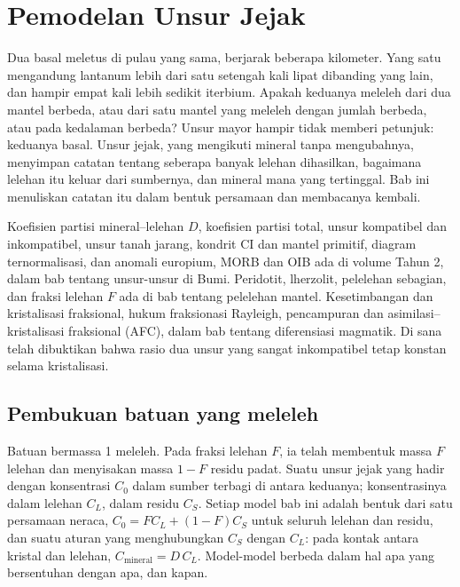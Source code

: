 \chapter{Pemodelan Unsur Jejak}\label{ch:b3:trace-element-modelling}

Dua basal meletus di pulau yang sama, berjarak beberapa kilometer. Yang satu
mengandung lantanum lebih dari satu setengah kali lipat dibanding yang lain, dan hampir empat kali
lebih sedikit iterbium. Apakah keduanya meleleh dari dua mantel berbeda, atau dari satu mantel
yang meleleh dengan jumlah berbeda, atau pada kedalaman berbeda? Unsur mayor
hampir tidak memberi petunjuk: keduanya basal. Unsur jejak, yang mengikuti mineral
tanpa mengubahnya, menyimpan catatan tentang seberapa banyak lelehan dihasilkan, bagaimana
lelehan itu keluar dari sumbernya, dan mineral mana yang tertinggal. Bab ini menuliskan catatan itu
dalam bentuk persamaan dan membacanya kembali.

\begin{recall}
Koefisien partisi mineral--lelehan $D$, koefisien partisi total, unsur
kompatibel dan inkompatibel, unsur tanah jarang, kondrit CI
dan mantel primitif, diagram ternormalisasi, dan anomali europium,
MORB dan OIB ada di volume Tahun 2, dalam bab tentang unsur-unsur di
Bumi. Peridotit, lherzolit, pelelehan sebagian, dan fraksi lelehan $F$
ada di bab tentang pelelehan mantel. Kesetimbangan dan kristalisasi
fraksional, hukum fraksionasi Rayleigh, pencampuran dan
asimilasi--kristalisasi fraksional (AFC), dalam bab tentang diferensiasi
magmatik. Di sana telah dibuktikan bahwa rasio dua unsur yang sangat inkompatibel
tetap konstan selama kristalisasi.
\end{recall}

\section{Pembukuan batuan yang meleleh}\label{sec:b3:trace-element-modelling:balance}

Batuan bermassa 1 meleleh. Pada fraksi lelehan $F$, ia telah membentuk massa
$F$ lelehan dan menyisakan massa $1 - F$ residu padat. Suatu unsur jejak yang
hadir dengan konsentrasi $C_0$ dalam sumber terbagi di antara keduanya;
konsentrasinya dalam lelehan $C_L$, dalam residu $C_S$. Setiap model bab ini
adalah bentuk dari satu persamaan neraca, $C_0 = FC_L + (1 - F)C_S$
untuk seluruh lelehan dan residu, dan suatu aturan yang menghubungkan $C_S$
dengan $C_L$: pada kontak antara kristal dan lelehan, $C_{\text{mineral}} = D\,C_L$.
Model-model berbeda dalam hal apa yang bersentuhan dengan apa, dan kapan.

